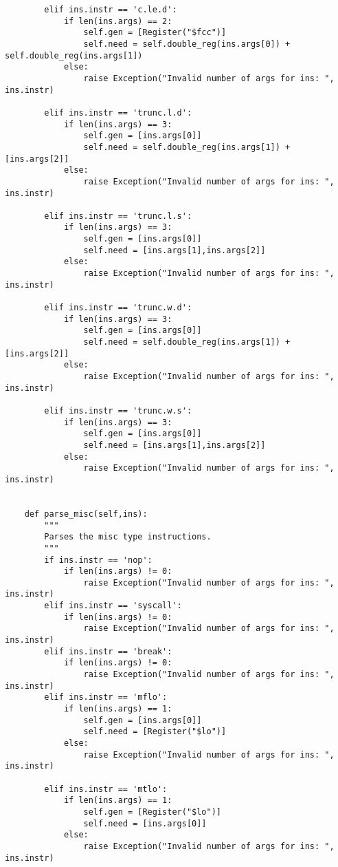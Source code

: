 \begin{lstlisting}
        elif ins.instr == 'c.le.d': 
            if len(ins.args) == 2:
                self.gen = [Register("$fcc")]
                self.need = self.double_reg(ins.args[0]) + self.double_reg(ins.args[1])
            else:
                raise Exception("Invalid number of args for ins: ", ins.instr)
                         
        elif ins.instr == 'trunc.l.d':
            if len(ins.args) == 3:
                self.gen = [ins.args[0]]
                self.need = self.double_reg(ins.args[1]) + [ins.args[2]]
            else:
                raise Exception("Invalid number of args for ins: ", ins.instr)
                         
        elif ins.instr == 'trunc.l.s':
            if len(ins.args) == 3:
                self.gen = [ins.args[0]]
                self.need = [ins.args[1],ins.args[2]]
            else:
                raise Exception("Invalid number of args for ins: ", ins.instr)
                        
        elif ins.instr == 'trunc.w.d':
            if len(ins.args) == 3:
                self.gen = [ins.args[0]]
                self.need = self.double_reg(ins.args[1]) + [ins.args[2]]
            else:
                raise Exception("Invalid number of args for ins: ", ins.instr)
        
        elif ins.instr == 'trunc.w.s':
            if len(ins.args) == 3:
                self.gen = [ins.args[0]]
                self.need = [ins.args[1],ins.args[2]]
            else:
                raise Exception("Invalid number of args for ins: ", ins.instr)        
            

    def parse_misc(self,ins):
        """
        Parses the misc type instructions.
        """
        if ins.instr == 'nop':
            if len(ins.args) != 0:
                raise Exception("Invalid number of args for ins: ", ins.instr)
        elif ins.instr == 'syscall':
            if len(ins.args) != 0:
                raise Exception("Invalid number of args for ins: ", ins.instr)
        elif ins.instr == 'break':
            if len(ins.args) != 0:
                raise Exception("Invalid number of args for ins: ", ins.instr)
        elif ins.instr == 'mflo': 
            if len(ins.args) == 1:
                self.gen = [ins.args[0]]
                self.need = [Register("$lo")]
            else:
                raise Exception("Invalid number of args for ins: ", ins.instr)
                
        elif ins.instr == 'mtlo':  
            if len(ins.args) == 1:
                self.gen = [Register("$lo")]
                self.need = [ins.args[0]]
            else:
                raise Exception("Invalid number of args for ins: ", ins.instr)
                           

\end{lstlisting}
